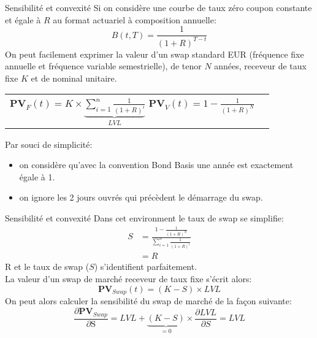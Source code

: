\documentclass{beamer}
\begin{document}
\begin{frame}{Sensibilité et convexité}
Si on considère une courbe de taux zéro coupon constante et égale à $R$ au format actuariel à composition annuelle:
\[
B(t,T)=\frac{1}{(1+R)^{T-t}}
\]
On peut facilement exprimer la valeur d'un swap standard EUR (fréquence fixe annuelle et fréquence variable semestrielle), de tenor $N$ années, receveur de taux fixe $K$ et de nominal unitaire.
\begin{center}
\begin{tabular}{c c} 
$\textbf{PV}_F(t) = K \times \underbrace{\sum_{i=1}^{n} \frac{1}{(1+R)^i}}_{LVL}$ 
$\textbf{PV}_V(t) = 1-\frac{1}{(1+R)^N}$
\end{tabular}
\end{center}
Par souci de simplicité:\\
\begin{itemize}
\item on considère qu'avec la convention Bond Basis une année est exactement égale à 1.
\item on ignore les 2 jours ouvrés qui précèdent le démarrage du swap.
\end{itemize}
\end{frame}

\begin{frame}{Sensibilité et convexité}
Dans cet environment le taux de swap se simplifie:
\[
\begin{split}
S&=\frac{1-\frac{1}{(1+R)^N}}{\sum_{i=1}^{n} \frac{1}{(1+R)^i}}\\
&=R
\end{split}
\]
R et le taux de swap ($S$) s'identifient parfaitement.\\
La valeur d'un swap de marché receveur de taux fixe s'écrit alors:
\[
\textbf{PV}_{Swap}(t)=(K-S) \times LVL 
\]
On peut alors calculer la sensibilité du swap de marché de la façon suivante:
\[
\frac{\partial \textbf{PV}_{Swap}}{\partial \text{S}}=LVL+\underbrace{(K-S)}_{=0} \times \frac{\partial LVL}{\partial S}=LVL 
\]

\end{frame}
\end{document}
